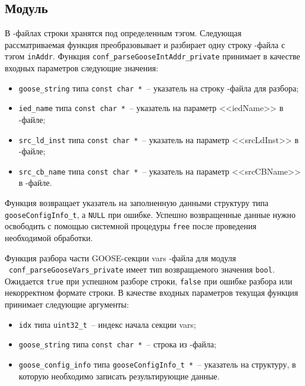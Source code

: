 \subsection{Модуль \moduleXml}

В \cid-файлах строки хранятся под определенным тэгом. Следующая рассматриваемая функция преобразовывает и разбирает одну строку \cid-файла с тэгом \lstinline{inAddr}.
Функция \lstinline{conf_parseGooseIntAddr_private} принимает в качестве входных параметров следующие значения:

\begin{itemize}
    \item \lstinline{goose_string} типа \lstinline{const char *}~-- указатель на строку \cid-файла для разбора;
    \item \lstinline{ied_name} типа \lstinline{const char *}~-- указатель на параметр <<iedName>> в \cid-файле;
    \item \lstinline{src_ld_inst} типа \lstinline{const char *}~-- указатель на параметр <<srcLdInst>> в \cid-файле;
    \item \lstinline{src_cb_name} типа \lstinline{const char *}~-- указатель на параметр <<srcCBName>> в \cid-файле.
\end{itemize}

Функция возвращает указатель на заполненную данными структуру типа \lstinline{gooseConfigInfo_t}, а \lstinline{NULL} при ошибке.
Успешно возвращенные данные нужно освободить с помощью системной процедуры
\lstinline{free} после проведения необходимой обработки.

Функция разбора части GOOSE-секции vars \cid-файла для модуля \moduleCfg\ \lstinline{conf_parseGooseVars_private} имеет тип возвращаемого значения \lstinline{bool}. Ожидается \lstinline{true} при успешном разборе строки, \lstinline{false} при ошибке разбора или некорректном формате строки. В качестве входных параметров текущая
функция принимает следующие аргументы:

\begin{itemize}
    \item \lstinline{idx} типа \lstinline{uint32_t}~-- индекс начала секции vars;
    \item \lstinline{goose_string} типа \lstinline{const char *}~-- строка из \cid-файла;
    \item \lstinline{goose_config_info} типа \lstinline{gooseConfigInfo_t *}~-- указатель на структуру, в которую необходимо записать результирующие данные.
\end{itemize}

